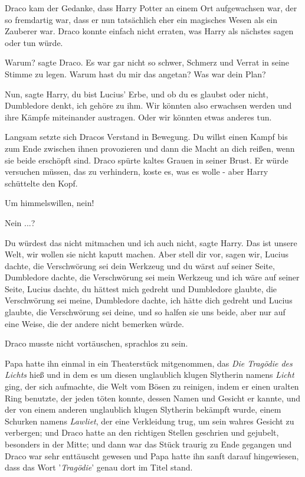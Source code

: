 Draco kam der Gedanke, dass Harry Potter an einem Ort aufgewachsen war, der so
fremdartig war, dass er nun tatsächlich eher ein magisches Wesen als ein
Zauberer war. Draco konnte einfach nicht erraten, was Harry als nächstes sagen
oder tun würde.

\glqq{}Warum?\grqq{} sagte Draco. Es war gar nicht so schwer, Schmerz und Verrat
in seine Stimme zu legen. \glqq{}Warum hast du mir das angetan? Was war dein
Plan?\grqq{}

\glqq{}Nun\grqq{}, sagte Harry, \glqq{}du bist Lucius' Erbe, und ob du es
glaubst oder nicht, Dumbledore denkt, ich gehöre zu ihm. Wir könnten also
erwachsen werden und ihre Kämpfe miteinander austragen. Oder wir könnten etwas
anderes tun.\grqq{}

Langsam setzte sich Dracos Verstand in Bewegung. \glqq{}Du willst einen Kampf
bis zum Ende zwischen ihnen provozieren und dann die Macht an dich reißen, wenn
sie beide erschöpft sind.\grqq{} Draco spürte kaltes Grauen in seiner Brust. Er
würde versuchen müssen, das zu verhindern, koste es, was es wolle - aber Harry
schüttelte den Kopf.

\glqq{}Um himmelswillen, nein!\grqq{}

\glqq{}Nein ...?\grqq{}

\glqq{}Du würdest das nicht mitmachen und ich auch nicht\grqq{}, sagte Harry.
\glqq{}Das ist unsere Welt, wir wollen sie nicht kaputt machen. Aber stell dir
vor, sagen wir, Lucius dachte, die Verschwörung sei dein Werkzeug und du wärst
auf seiner Seite, Dumbledore dachte, die Verschwörung sei mein Werkzeug und ich
wäre auf seiner Seite, Lucius dachte, du hättest mich gedreht und Dumbledore
glaubte, die Verschwörung sei meine, Dumbledore dachte, ich hätte dich gedreht
und Lucius glaubte, die Verschwörung sei deine, und so halfen sie uns beide,
aber nur auf eine Weise, die der andere nicht bemerken würde.\grqq{}

Draco musste nicht vortäuschen, sprachlos zu sein.

Papa hatte ihn einmal in ein Theaterstück mitgenommen, das \emph{\glqq{}Die
Tragödie des Lichts\grqq{}} hieß und in dem es um diesen unglaublich klugen
Slytherin namens \emph{Licht} ging, der sich aufmachte, die Welt vom Bösen zu
reinigen, indem er einen uralten Ring benutzte, der jeden töten konnte, dessen
Namen und Gesicht er kannte, und der von einem anderen unglaublich klugen
Slytherin bekämpft wurde, einem Schurken namens \emph{Lawliet}, der eine
Verkleidung trug, um sein wahres Gesicht zu verbergen; und Draco hatte an den
richtigen Stellen geschrien und gejubelt, besonders in der Mitte; und dann war
das Stück traurig zu Ende gegangen und Draco war sehr enttäuscht gewesen und
Papa hatte ihn sanft darauf hingewiesen, dass das Wort '\emph{Tragödie}' genau
dort im Titel stand.

